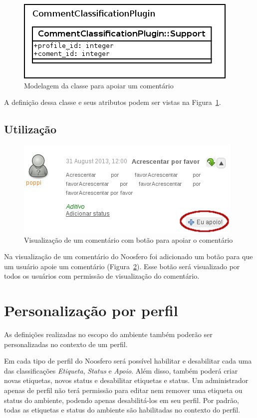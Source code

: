 \documentclass[11pt]{article}
\begin{document}
\begin{figure}[h]
\center
\includegraphics[scale=0.5]{support-model.png}
\caption{Modelagem da classe para apoiar um comentário}
\label{fig:support-model}
\end{figure}

A definição dessa classe e seus atributos podem ser vistas na
Figura~\ref{fig:support-model}.

\subsection{Utilização}

\begin{figure}[h]
\center
\includegraphics[scale=0.6]{comment-view-support.png}
\caption{Visualização de um comentário com botão para apoiar o
comentário}
\label{fig:comment-view-support}
\end{figure}

Na visualização de um comentário do Noosfero foi adicionado um botão para
que um usuário apoie um comentário
(Figura~\ref{fig:comment-view-support}). Esse botão será visualizado por
todos os usuários com permissão de visualização do comentário.

\section{Personalização por perfil}

As definições realizadas no escopo do ambiente também poderão ser
personalizadas no contexto de um perfil.

Em cada tipo de perfil do Noosfero será possível habilitar e desabilitar
cada uma das classificações {\it Etiqueta}, {\it Status} e {\it Apoio}.
Além disso, também poderá criar novas etiquetas, novos status e
desabilitar etiquetas e status. Um administrador
apenas de perfil não terá permissão para editar nem remover uma etiqueta
ou status do ambiente, podendo apenas desabilitá-los em seu perfil. Por
padrão, todas as etiquetas e status do ambiente são habilitadas no
contexto do perfil.
\end{document}
